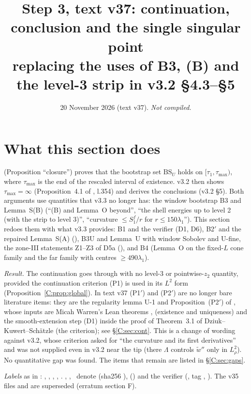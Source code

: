 \documentclass[11pt]{article}
\title{Step 3, text v37: continuation, conclusion and the single singular point\\[2pt]\large replacing the uses of B3, (B) and the level-3 strip in v3.2 \S4.3--\S5}
\author{}\date{20 November 2026 (text v37). \emph{Not compiled.}}
\begin{document}
\maketitle
\fi

\section{What this section does}\label{C:sec:intro}
 (Proposition ``closure'') proves that the bootstrap set $\mathrm{BS}_U$ holds on $[\tau_1,\tau_{\max})$, where $\tau_{\max}$ is the end of the rescaled interval of existence. v3.2 then shows $\tau_{\max}=\infty$ (Proposition~4.1 of , l.354) and derives the conclusions (v3.2 \S5). Both arguments use quantities that v3.3 no longer has: the window bootstrap B3 and Lemma~S(B) (``(B) and Lemma~O beyond'', ``the shell energies up to level 2 (with the strip to level 3)'', ``curvature $\le S_1^f/r$ for $r\le150\lambda_1$''). This section redoes them with what v3.3 provides: B1 and the verifier (D1, D6), B2$'$ and the repaired Lemma~S(A) (), B3U and Lemma~U with window Sobolev and U-fine, the zone-III statements Z1--Z3 of D5a (), and B4 (Lemma~O on the fixed-$L$ cone family and the far family with centres $\ge490\lambda_1$).

\noindent\emph{Result.} The continuation goes through with no level-3 or pointwise-$z_2$ quantity, provided the continuation criterion (P1) is used in its $L^2$ form (Proposition~\ref{C:prop:global}). In text v37 (P1$'$) and (P2$'$) are no longer bare literature items: they are the regularity lemma U-1 and Proposition~(P2$'$) of  \tH, whose inputs are Micah Warren's Lean theorems ,  \cite{CWFlow} (existence and uniqueness) and the smooth-extension step (D1) inside the proof of Theorem~3.1 of Dziuk--Kuwert--Sch\"atzle \cite{DKS2002} (the criterion); see \S\ref{C:sec:cont}. This is a change of wording against v3.2, whose criterion asked for ``the curvature and its first derivatives'' and was not supplied even in v3.2 near the tip (there $\Lambda$ controls $\tilde w''$ only in $L^2_\rho$). No quantitative gap was found. The items that remain are listed in \S\ref{C:sec:gaps}.

\noindent\emph{Labels} as in : \tC, \tP, \tH, \tE, \tB. \SU, \SZ, \SV\ denote  (sha256 ),  () and the verifier  (, tag , ). The v35 files and  are superseded (erratum section F).
\end{document}
